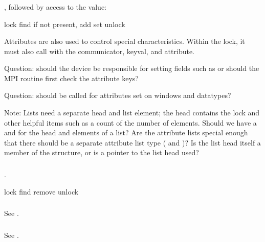 \documentclass{article}
\begin{document}
\subsubsection{}
\begin{adi3}
, followed by access to the value:
\begin{algorithm}
lock
find
if not present, add
set
unlock
\end{algorithm}
Attributes are also used to control special characteristics.  Within
the lock, it must also call  with the
communicator, keyval, and attribute.  

Question: should the device be responsible for setting fields such as
 or should the MPI routine first check
the attribute keys?

Question: should  be called for
attributes set on windows and datatypes?

Note: Lists need a separate head and list element; the head contains
the lock and other helpful items such as a count of the number of
elements.  Should we have a  and
 for the head and elements of a list?  Are
the attribute lists special enough that there should be a separate
attribute list type ( and
)?   Is the list head itself a member
of the structure, or is a pointer to the list head used?
\end{adi3}

\subsubsection{}
\begin{adi3}
.
\begin{algorithm}
lock
find
remove
unlock
\end{algorithm}
\end{adi3}

\subsubsection{}
See .

\subsubsection{}
See .
\end{document}
